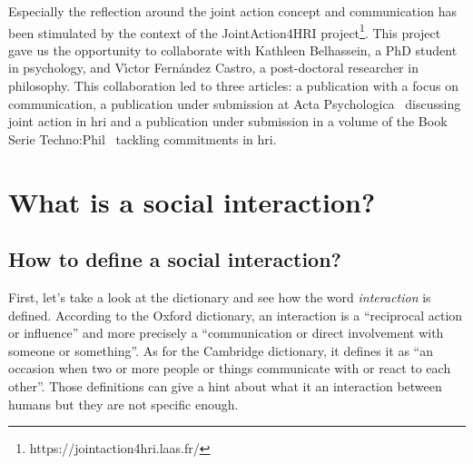 \documentclass[a4paper,11pt,twoside]{StyleThese}
\begin{document}
\bigskip

Especially the reflection around the joint action concept and communication has been stimulated by the context of the JointAction4HRI project\footnote{https://jointaction4hri.laas.fr/}. This project gave us the opportunity to collaborate with Kathleen Belhassein, a PhD student in psychology, and V{\'\i}ctor Fern{\'a}ndez Castro, a post-doctoral researcher in philosophy. This collaboration led to three articles: a publication with a focus on communication, a publication under submission at Acta Psychologica~\cite{belhassein_2021_adressing} discussing joint action in \acrshort{hri} and a publication under submission in a volume of the Book Serie Techno:Phil~\cite{castro_2021_role} tackling commitments in \acrshort{hri}.

\section{What is a social interaction?}
\label{chap1:sec:soc_int}

\subsection{How to define a social interaction?}
First, let’s take a look at the dictionary and see how the word \emph{interaction} is defined. According to the Oxford dictionary, an interaction is a ``reciprocal action or influence'' and more precisely a ``communication or direct involvement with someone or something''. As for the Cambridge dictionary, it defines it as ``an occasion when two or more people or things communicate with or react to each other''. Those definitions can give a hint about what it an interaction between humans but they are not specific enough. 
\end{document}
